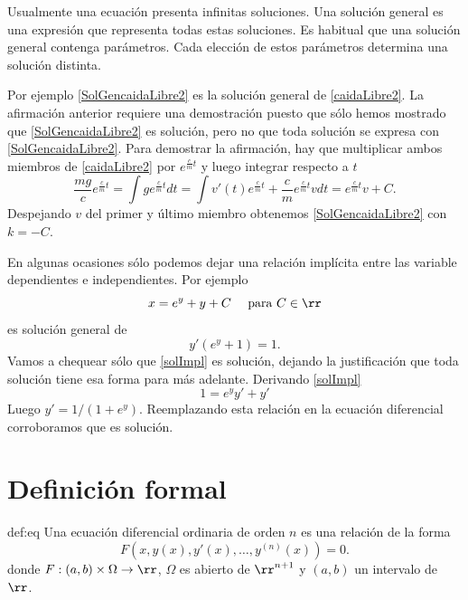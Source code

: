 \begin{definicion}{} Usualmente una ecuación presenta infinitas soluciones. Una solución general  es una expresión que representa todas estas soluciones. Es habitual que una solución general contenga parámetros. Cada elección de estos parámetros determina una solución distinta.
 \end{definicion}

 Por ejemplo \eqref{SolGencaidaLibre2} es la solución general de \eqref{caidaLibre2}.
  La afirmación anterior requiere una demostración puesto que sólo hemos mostrado que \eqref{SolGencaidaLibre2} es solución, pero no
que toda solución se expresa con \eqref{SolGencaidaLibre2}. Para demostrar la afirmación, hay que multiplicar ambos miembros de \eqref{caidaLibre2} 
por $e^{\frac{c}{m}t}$ y luego integrar respecto a $t$ 
\[\frac{mg}{c}e^{\frac{c}{m}t}=\int ge^{\frac{c}{m}t}dt=\int v'(t)e^{\frac{c}{m}t}+\frac{c}{m}e^{\frac{c}{m}t} vdt=e^{\frac{c}{m}t}v+C.\]
 Despejando $v$ del primer y último miembro obtenemos \eqref{SolGencaidaLibre2} con $k=-C$.

 




\begin{ejemplo}{} En algunas ocasiones sólo podemos dejar una relación implícita entre las variable dependientes e independientes. Por ejemplo
\begin{equation}\label{solImpl}x=e^y+y+C\quad\text{ para } C\in\rr\end{equation}
es solución general de
\[y'(e^y+1)=1.\]
Vamos a chequear sólo que \eqref{solImpl} es solución, dejando la justificación que toda solución tiene esa forma para más adelante. Derivando \eqref{solImpl}
\[ 1=e^yy'+y'\]
Luego $y'=1/(1+e^{y})$. Reemplazando esta relación  en la ecuación diferencial corroboramos que es solución.
\end{ejemplo}



\section{Definición formal}

\begin{definicion}{def:eq} Una ecuación diferencial
ordinaria de orden $n$ es una relación de la forma
\[\boxed{F(x,y(x),y'(x),\ldots,y^{(n)}(x))=0}.\]
donde $F:(a,b)\times \Omega\to\rr$, $\Omega$ es abierto de $\rr^{n+1}$ y $(a,b)$ un intervalo de $\rr$.
  \end{definicion}






